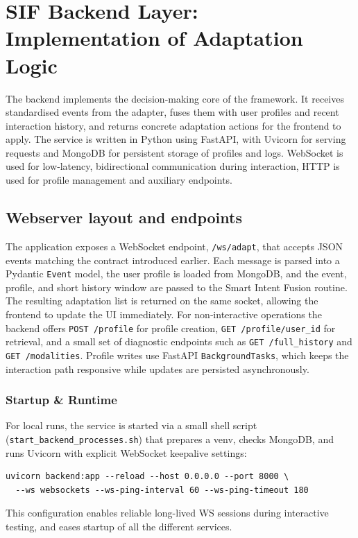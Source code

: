 \section{SIF Backend Layer: Implementation of Adaptation Logic}
The backend implements the decision‑making core of the framework. It receives standardised events from the adapter, fuses them with user profiles and recent interaction history, and returns concrete adaptation actions for the frontend to apply. The service is written in Python using FastAPI, with Uvicorn for serving requests and MongoDB for persistent storage of profiles and logs. WebSocket is used for low‑latency, bidirectional communication during interaction, HTTP is used for profile management and auxiliary endpoints.

\subsection{Webserver layout and endpoints}
The application exposes a WebSocket endpoint, \texttt{/ws/adapt}, that accepts JSON events matching the contract introduced earlier. Each message is parsed into a Pydantic \texttt{Event} model, the user profile is loaded from MongoDB, and the event, profile, and short history window are passed to the Smart Intent Fusion routine. The resulting adaptation list is returned on the same socket, allowing the frontend to update the UI immediately. For non‑interactive operations the backend offers \texttt{POST /profile} for profile creation, \texttt{GET /profile/{user\_id}} for retrieval, and a small set of diagnostic endpoints such as \texttt{GET /full\_history} and \texttt{GET /modalities}. Profile writes use FastAPI \texttt{BackgroundTasks}, which keeps the interaction path responsive while updates are persisted asynchronously.

\subsubsection*{Startup \& Runtime}
For local runs, the service is started via a small shell script (\texttt{start\_backend\_processes.sh}) that prepares a venv, checks MongoDB, and runs Uvicorn with explicit WebSocket keepalive settings:
\begin{lstlisting}[basicstyle=\ttfamily\small,caption={Backend startup (excerpt)}]
uvicorn backend:app --reload --host 0.0.0.0 --port 8000 \
  --ws websockets --ws-ping-interval 60 --ws-ping-timeout 180
\end{lstlisting}
This configuration enables reliable long-lived WS sessions during interactive testing, and eases startup of all the different services.

